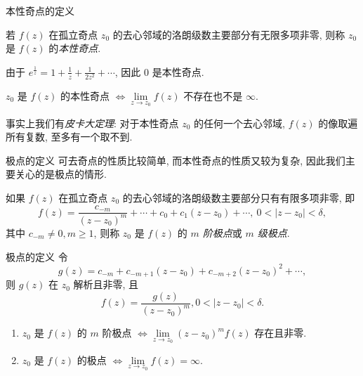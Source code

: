 \begin{frame}{本性奇点的定义}
	\onslide<+->
	\begin{definition}
		若 $f(z)$ 在孤立奇点 $z_0$ 的去心邻域的洛朗级数主要部分有无限多项非零, 则称 $z_0$ 是 $f(z)$ 的\emph{本性奇点}.
	\end{definition}

	\onslide<+->
	\begin{example}
		由于 $\displaystyle e^{\frac1z}=1+\frac1z+\frac1{2z^2}+\cdots$, 因此 $0$ 是本性奇点.
	\end{example}

	\onslide<+->
	\begin{theorem}
		$z_0$ 是 $f(z)$ 的本性奇点 $\iff\lim\limits_{z\to z_0}f(z)$ 不存在也不是 $\infty$.
	\end{theorem}

	\onslide<+->
	事实上我们有\emph{皮卡大定理}: 对于本性奇点 $z_0$ 的任何一个去心邻域, $f(z)$ 的像取遍所有复数, 至多有一个取不到.
\end{frame}


\begin{frame}{极点的定义}
	\onslide<+->
	可去奇点的性质比较简单, 而本性奇点的性质又较为复杂, 因此我们主要关心的是极点的情形.

	\onslide<+->
	\begin{definition}
		如果 $f(z)$ 在孤立奇点 $z_0$ 的去心邻域的洛朗级数主要部分只有有限多项非零, 即
		\[f(z)=\frac{c_{-m}}{(z-z_0)^m}+\cdots+c_0+c_1(z-z_0)+\cdots,\ 0<|z-z_0|<\delta,\]
		其中 $c_{-m}\neq 0,m\ge 1$, 则称 $z_0$ 是 $f(z)$ 的 \emph{$m$ 阶极点}或 \emph{$m$ 级极点}.
	\end{definition}
\end{frame}


\begin{frame}{极点的定义}
	\onslide<+->
	令
	\[g(z)=c_{-m}+c_{-m+1}(z-z_0)+c_{-m+2}(z-z_0)^2+\cdots,\]
	则 $g(z)$ 在 $z_0$ 解析且非零,
	\onslide<+->
	且
	\[f(z)=\dfrac{g(z)}{(z-z_0)^m},0<|z-z_0|<\delta.\]

	\onslide<+->
	\begin{theorem}
		\begin{enumerate}
			\item $z_0$ 是 $f(z)$ 的 $m$ 阶极点 $\iff\lim\limits_{z\to z_0}(z-z_0)^mf(z)$ 存在且非零.
			\item $z_0$ 是 $f(z)$ 的极点 $\iff\lim\limits_{z\to z_0}f(z)=\infty$.
		\end{enumerate}
	\end{theorem}
\end{frame}


